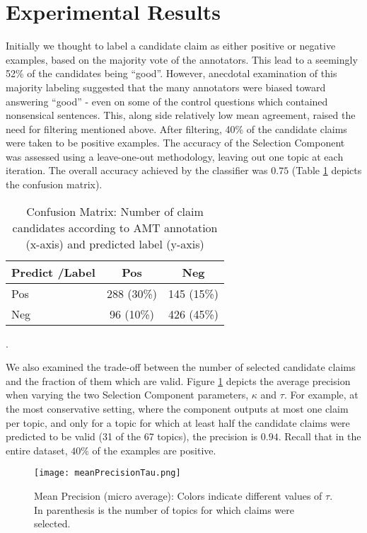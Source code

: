 \documentclass[11pt]{article}
\begin{document}
\section{Experimental Results}

Initially we thought to label a candidate claim as either positive or negative examples, based on the majority vote of the annotators. This lead to a seemingly 52\% of the candidates being ``good''. However, anecdotal examination of this majority labeling suggested that the many annotators were biased toward answering ``good'' - even on some of the control questions which contained nonsensical sentences. This, along side relatively low mean agreement, raised the need for filtering mentioned above. After filtering, 40\% of the candidate claims were taken to be positive examples.
The accuracy of the Selection Component was assessed using a leave-one-out methodology, leaving out one topic at each iteration. The overall accuracy achieved by the classifier was $0.75$ (Table \ref{tab:confusion} depicts the confusion matrix).

\begin{table}
\begin{center}
\begin{tabular}{ |l|c|c| }
\hline
 Predict /Label & Pos & Neg \\ 
\hline
 Pos & 288 (30\%) & 145 (15\%) \\  
\hline
 Neg & 96 (10\%) & 426 (45\%) \\ 
\hline
\end{tabular}
\caption {Confusion Matrix: Number of claim candidates according to AMT %
annotation (x-axis) and predicted label (y-axis)}.\label{tab:confusion}
\end{center}
\end{table}

We also examined the trade-off between the number of selected candidate claims and the fraction of them which are valid. Figure \ref{fig:results} depicts the average precision when varying the two Selection Component parameters, $\kappa$ and $\tau$. For example, at the most conservative setting, where the component outputs at most one claim per topic, and only for a topic for which at least half the candidate claims were predicted to be valid (31 of the 67 topics), the precision is $0.94$. Recall that in the entire dataset, $40\%$ of the examples are positive. 

\begin{figure}[!ht]
  \centering
    \texttt{[image: meanPrecisionTau.png]}
  \caption{Mean Precision (micro average): Colors indicate different values of $\tau$. In parenthesis is the number of topics for which claims were selected.}\label{fig:results}
\end{figure}
\end{document}
